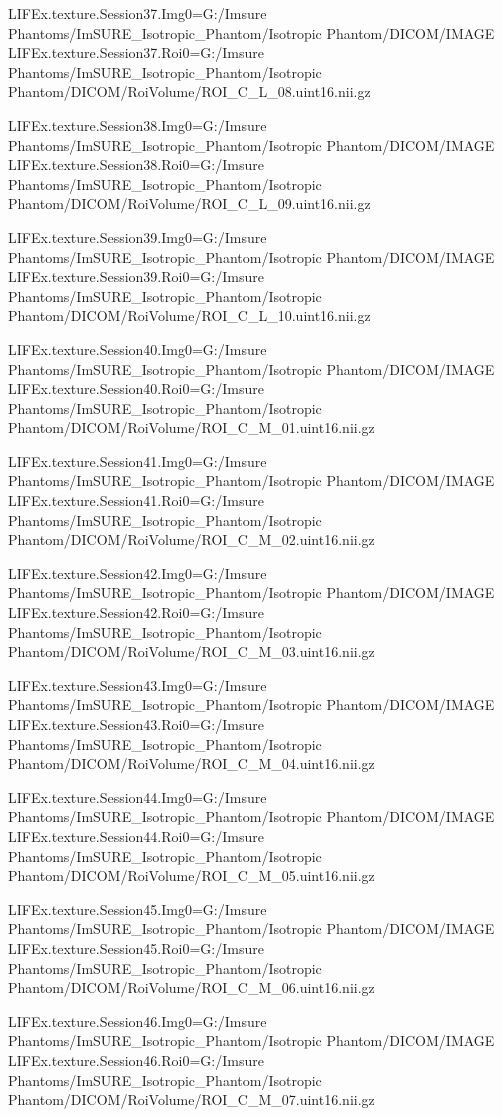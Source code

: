 LIFEx.texture.Session37.Img0=G:/Imsure Phantoms/ImSURE_Isotropic_Phantom/Isotropic Phantom/DICOM/IMAGE
LIFEx.texture.Session37.Roi0=G:/Imsure Phantoms/ImSURE_Isotropic_Phantom/Isotropic Phantom/DICOM/RoiVolume/ROI_C_L_08.uint16.nii.gz

LIFEx.texture.Session38.Img0=G:/Imsure Phantoms/ImSURE_Isotropic_Phantom/Isotropic Phantom/DICOM/IMAGE
LIFEx.texture.Session38.Roi0=G:/Imsure Phantoms/ImSURE_Isotropic_Phantom/Isotropic Phantom/DICOM/RoiVolume/ROI_C_L_09.uint16.nii.gz

LIFEx.texture.Session39.Img0=G:/Imsure Phantoms/ImSURE_Isotropic_Phantom/Isotropic Phantom/DICOM/IMAGE
LIFEx.texture.Session39.Roi0=G:/Imsure Phantoms/ImSURE_Isotropic_Phantom/Isotropic Phantom/DICOM/RoiVolume/ROI_C_L_10.uint16.nii.gz

LIFEx.texture.Session40.Img0=G:/Imsure Phantoms/ImSURE_Isotropic_Phantom/Isotropic Phantom/DICOM/IMAGE
LIFEx.texture.Session40.Roi0=G:/Imsure Phantoms/ImSURE_Isotropic_Phantom/Isotropic Phantom/DICOM/RoiVolume/ROI_C_M_01.uint16.nii.gz

LIFEx.texture.Session41.Img0=G:/Imsure Phantoms/ImSURE_Isotropic_Phantom/Isotropic Phantom/DICOM/IMAGE
LIFEx.texture.Session41.Roi0=G:/Imsure Phantoms/ImSURE_Isotropic_Phantom/Isotropic Phantom/DICOM/RoiVolume/ROI_C_M_02.uint16.nii.gz

LIFEx.texture.Session42.Img0=G:/Imsure Phantoms/ImSURE_Isotropic_Phantom/Isotropic Phantom/DICOM/IMAGE
LIFEx.texture.Session42.Roi0=G:/Imsure Phantoms/ImSURE_Isotropic_Phantom/Isotropic Phantom/DICOM/RoiVolume/ROI_C_M_03.uint16.nii.gz

LIFEx.texture.Session43.Img0=G:/Imsure Phantoms/ImSURE_Isotropic_Phantom/Isotropic Phantom/DICOM/IMAGE
LIFEx.texture.Session43.Roi0=G:/Imsure Phantoms/ImSURE_Isotropic_Phantom/Isotropic Phantom/DICOM/RoiVolume/ROI_C_M_04.uint16.nii.gz

LIFEx.texture.Session44.Img0=G:/Imsure Phantoms/ImSURE_Isotropic_Phantom/Isotropic Phantom/DICOM/IMAGE
LIFEx.texture.Session44.Roi0=G:/Imsure Phantoms/ImSURE_Isotropic_Phantom/Isotropic Phantom/DICOM/RoiVolume/ROI_C_M_05.uint16.nii.gz

LIFEx.texture.Session45.Img0=G:/Imsure Phantoms/ImSURE_Isotropic_Phantom/Isotropic Phantom/DICOM/IMAGE
LIFEx.texture.Session45.Roi0=G:/Imsure Phantoms/ImSURE_Isotropic_Phantom/Isotropic Phantom/DICOM/RoiVolume/ROI_C_M_06.uint16.nii.gz

LIFEx.texture.Session46.Img0=G:/Imsure Phantoms/ImSURE_Isotropic_Phantom/Isotropic Phantom/DICOM/IMAGE
LIFEx.texture.Session46.Roi0=G:/Imsure Phantoms/ImSURE_Isotropic_Phantom/Isotropic Phantom/DICOM/RoiVolume/ROI_C_M_07.uint16.nii.gz

